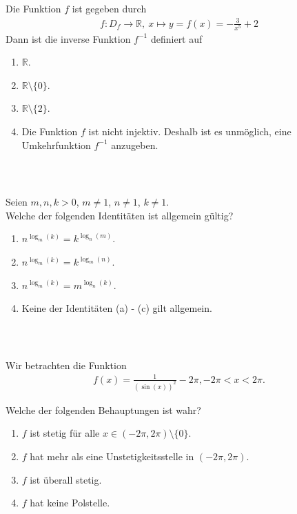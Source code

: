 \subsection*{}
Die Funktion $ f $ ist gegeben durch
\begin{align*}
f : D_f \to \mathbb{R}, \ 
x \mapsto y = f(x) = - \frac{3}{x^5} +2
\end{align*}
Dann ist die inverse Funktion $ f^{-1} $ definiert auf 
\renewcommand{\labelenumi}{(\alph{enumi})}
\begin{enumerate}
\item 
$ \mathbb{R} $.
\item
$ \mathbb{R} \setminus \lbrace 0 \rbrace $.
\item
$ \mathbb{R} \setminus \lbrace 2 \rbrace $.
\item
Die Funktion $ f $ ist nicht injektiv. Deshalb ist es unmöglich, eine Umkehrfunktion $ f^{-1} $ anzugeben.
\end{enumerate}
\ \\
\subsection*{}
Seien $ m,n,k > 0 $, $ m \neq 1 $, $ n \neq 1 $, $ k \neq 1 $.\\
Welche der folgenden Identitäten ist allgemein gültig?
\renewcommand{\labelenumi}{(\alph{enumi})}
\begin{enumerate}
\item 
$ n^{\log_m(k)} = k^{\log_n(m)} $.
\item
$ n^{\log_m(k)} = k^{\log_m(n)}$.
\item
$ n^{\log_m(k)} = m^{\log_n(k)}$.
\item
Keine der Identitäten (a) - (c) gilt allgemein.
\end{enumerate}
\ \\ 
\subsection*{}
Wir betrachten die Funktion
\begin{align*}
f(x) = \frac{1}{(\sin(x))^2}- 2 \pi, -2 \pi < x < 2 \pi.
\end{align*}

Welche der folgenden Behauptungen ist wahr?
\renewcommand{\labelenumi}{(\alph{enumi})}
\begin{enumerate}
\item 
$ f $ ist stetig für alle $ x \in (-2 \pi, 2 \pi) \setminus \lbrace 0 \rbrace $.
\item
$ f $ hat mehr als eine Unstetigkeitsstelle in $ (- 2 \pi , 2 \pi ) $.

\item
$ f $ ist überall stetig.
\item
$ f $ hat keine Polstelle.
\end{enumerate}
\ \\
